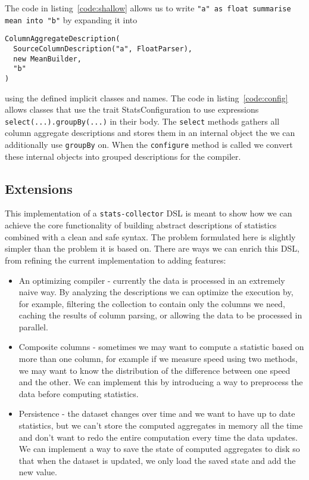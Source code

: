 The code in listing~\ref{code:shallow} allows us to write \texttt{"a" as float summarise mean into "b"} by expanding it into 
\begin{verbatim}
ColumnAggregateDescription(
  SourceColumnDescription("a", FloatParser),
  new MeanBuilder,
  "b"
)
\end{verbatim}
using the defined implicit classes and names. The code in listing~\ref{code:config} allows classes that use the trait StatsConfiguration to use expressions \texttt{select(...).groupBy(...)} in their body. The \texttt{select} methods gathers all column aggregate descriptions and stores them in an internal object the we can additionally use \texttt{groupBy} on. When the \texttt{configure} method is called we convert these internal objects into grouped descriptions for the compiler.

\subsection{Extensions}

This implementation of a \texttt{stats-collector} DSL is meant to show how we can achieve the core functionality of building abstract descriptions of statistics combined with a clean and safe syntax. The problem formulated here is slightly simpler than the problem it is based on. There are ways we can enrich this DSL, from refining the current implementation to adding features:
\begin{itemize}
	\item An optimizing compiler - currently the data is processed in an extremely naive way. By analyzing the descriptions we can optimize the execution by, for example, filtering the collection to contain only the columns we need, caching the results of column parsing, or allowing the data to be processed in parallel.
  \item Composite columns - sometimes we may want to compute a statistic based on more than one column, for example if we measure speed using two methods, we may want to know the distribution of the difference between one speed and the other. We can implement this by introducing a way to preprocess the data before computing statistics.
  \item Persistence - the dataset changes over time and we want to have up to date statistics, but we can't store the computed aggregates in memory all the time and don't want to redo the entire computation every time the data updates. We can implement a way to save the state of computed aggregates to disk so that when the dataset is updated, we only load the saved state and add the new value.
\end{itemize}


